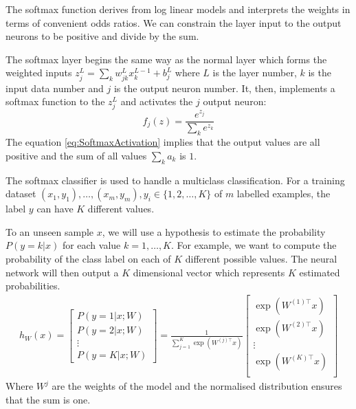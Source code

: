 The softmax function derives from log linear models and interprets the weights in terms of convenient odds ratios. We can constrain the layer input to the output neurons to be positive and divide by the sum.

The softmax layer begins the same way as the normal layer which forms the weighted inputs $z^L_j = \sum_{k} w^L_{jk} x^{L-1}_k + b^L_j$ where $L$ is the layer number, $k$ is the input data number and $j$ is the output neuron number. It, then, implements a softmax function to the $z^L_j$ and activates the $j$ output neuron:
\begin{equation}\label{eq:SoftmaxActivation}
f_j(z) = \frac{e^{z_j}}{\sum_k e^{z_k}}
\end{equation}
The equation \ref{eq:SoftmaxActivation} implies that the output values are all positive and the sum of all values $\sum_k a_k$ is $1$.

The softmax classifier is used to handle a multiclass classification. For a training dataset $(x_{1}, y_{1}), \ldots, (x_{m}, y_{m}), y_{i} \in \{1, 2, \ldots, K\} $ of $m$ labelled examples, the label $y$ can have $K$ different values.

To an unseen sample $x$, we will use a hypothesis to estimate the probability $P(y=k | x)$ for each value $k = 1, \ldots, K$. For example, we want to compute the probability of the class label on each of $K$ different possible values. The neural network will then output a $K$ dimensional vector which represents $K$ estimated probabilities. 
\begin{align}
h_{W}(x) =
\begin{bmatrix}
P(y = 1 | x; W) \\
P(y = 2 | x; W) \\
\vdots \\
P(y = K | x; W)
\end{bmatrix}
=
\frac{1}{ \sum_{j=1}^{K}{\exp(W^{(j)\top} x) }}
\begin{bmatrix}
\exp(W^{(1)\top} x ) \\
\exp(W^{(2)\top} x ) \\
\vdots \\
\exp(W^{(K)\top} x ) \\
\end{bmatrix}
\end{align}
Where $W^{j}$ are the weights of the model and the normalised distribution ensures that the sum is one.

